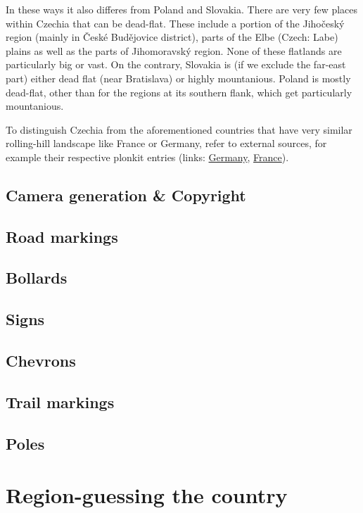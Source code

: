 \documentclass[12pt, oneside]{article}
\begin{document}
In these ways it also differes from Poland and Slovakia. There are very few places within Czechia that can be dead-flat. These include a portion of the Jihočeský region (mainly in České Budějovice district), parts of the Elbe (Czech: Labe) plains as well as the parts of Jihomoravský region. None of these flatlands are particularly big or vast. On the contrary, Slovakia is (if we exclude the far-east part) either dead flat (near Bratislava) or highly mountanious. Poland is mostly dead-flat, other than for the regions at its southern flank, which get particularly mountanious. 

To distinguish Czechia from the aforementioned countries that have very similar rolling-hill landscape like France or Germany, refer to external sources, for example their respective plonkit entries (links: \href{https://www.plonkit.net/germany}{Germany}, \href{https://www.plonkit.net/france}{France}).

\subsection{Camera generation \& Copyright}

\subsection{Road markings}

\subsection{Bollards}

\subsection{Signs}

\subsection{Chevrons}

\subsection{Trail markings}

\subsection{Poles}


\newpage
\section{Region-guessing the country}
\end{document}
